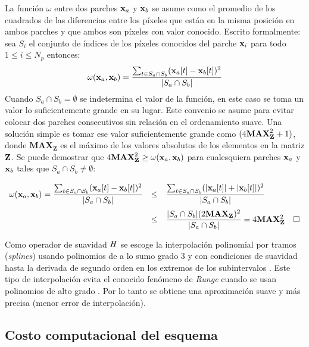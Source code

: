 La funci\'on $\omega$ entre dos parches $\mathbf{x}_a$ y $\mathbf{x}_b$ se asume como el promedio de los cuadrados de las diferencias entre los p\'ixeles que est\'an en la misma posici\'on en ambos parches y que ambos son p\'ixeles con valor conocido. Escrito formalmente: sea $S_i$ el conjunto de \'indices de los p\'ixeles conocidos del parche $\mathbf{x}_i$ para todo $1 \le i \le N_p$ entonces:
\begin{equation}
	\omega(\mathbf{x}_a, \mathbf{x}_b) = \frac{\sum_{t \in S_a \cap S_b} (\mathbf{x}_a[t] - \mathbf{x}_b[t])^2}{|S_a \cap S_b|}
	\label{eq:omega}
\end{equation}
Cuando $S_a \cap S_b = \emptyset$ se indetermina el valor de la funci\'on, en este caso se toma un valor lo suficientemente grande en su lugar. Este convenio se asume para evitar colocar dos parches consecutivos sin relaci\'on en el ordenamiento suave. Una soluci\'on simple es tomar ese valor suficientemente grande como $(4\mathbf{MAX}^2_{\mathbf{Z}} + 1)$, donde $\mathbf{MAX_Z}$ es el m\'aximo de los valores absolutos de los elementos en la matriz $\mathbf{Z}$. Se puede demostrar que $4\mathbf{MAX}^2_{\mathbf{Z}} \ge \omega(\mathbf{x}_a, \mathbf{x}_b)$ para cualesquiera parches $\mathbf{x}_a$ y $\mathbf{x}_b$ tales que $S_a \cap S_b \not= \emptyset$:
\begin{equation*}
	\def\arraystretch{2.5}
	\begin{array}{rcl}
		\displaystyle
		\omega(\x_a, \x_b) = \frac{\sum_{t \in S_a \cap S_b} (\x_a[t] - \x_b[t])^2}{|S_a \cap S_b|}
		&\le& \displaystyle\frac{\sum_{t \in S_a \cap S_b} (|\x_a[t]| + |\x_b[t]|)^2}{|S_a \cap S_b|}\\
		&\le& \displaystyle\frac{|S_a \cap S_b| (2\mathbf{MAX_Z})^2}{|S_a \cap S_b|} = 4\mathbf{MAX}^2_\Z \quad\square
	\end{array}
\end{equation*}

Como operador de suavidad $\mathit{H}$ se escoge la interpolaci\'on polinomial por tramos (\textit{splines}) usando polinomios de a lo sumo grado $3$ y con condiciones de suavidad hasta la derivada de segundo orden en los extremos de los subintervalos \cite{burden1996analisis}. Este tipo de interpolaci\'on evita el conocido fen\'omeno de \textit{Runge} cuando se usan polinomios de alto grado \cite{quarteroni2014approximation}. Por lo tanto se obtiene una aproximación suave y m\'as precisa (menor error de interpolación).

\subsection{Costo computacional del esquema}

